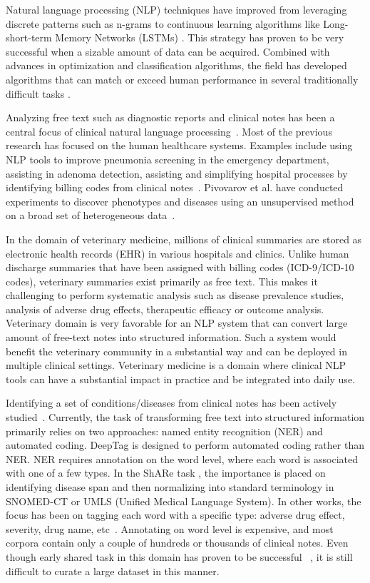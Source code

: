 \documentclass[fleqn,10pt]{wlscirep}
\begin{document}
Natural language processing (NLP)  techniques have improved from leveraging discrete patterns such as n-grams \cite{jurafsky2014speech} to continuous learning algorithms like Long-short-term Memory Networks (LSTMs) \cite{hochreiter1997long}. This strategy has proven to be very successful when a sizable amount of data can be acquired. Combined with advances in optimization and classification algorithms, the field has developed algorithms that can match or exceed human performance in several traditionally difficult tasks \cite{goldberg2017neural}.

Analyzing free text such as diagnostic reports and clinical notes has been a central focus of clinical natural language processing~\cite{velupillai2015recent}. Most of the previous research has focused on the human healthcare systems. Examples include using NLP tools to improve pneumonia screening in the emergency department, assisting in adenoma detection, assisting and simplifying hospital processes by identifying billing codes from clinical notes~\cite{demner2016aspiring}. Pivovarov et al. have conducted experiments to discover phenotypes and diseases using an unsupervised method on a broad set of heterogeneous data~\cite{pivovarov2015learning}.

In the domain of veterinary medicine, millions of clinical summaries are stored as electronic health records (EHR) in various hospitals and clinics. Unlike human discharge summaries that have been assigned with billing codes (ICD-9/ICD-10 codes), veterinary summaries exist primarily as free text. This makes it challenging to perform  systematic analysis  such as disease prevalence studies, analysis of adverse drug effects, therapeutic efficacy or outcome analysis. Veterinary domain is very favorable for an NLP system that can convert large amount of  free-text notes into structured information. Such a system would benefit the veterinary community in a substantial way and can be deployed in multiple clinical settings. Veterinary medicine is a domain where clinical NLP tools can have a substantial impact in practice and be integrated into daily use.

Identifying a set of conditions/diseases from clinical notes has been actively studied~\cite{demner2016aspiring,lipton2015learning}. Currently, the task of transforming free text into structured information primarily relies on two approaches: named entity recognition (NER) and automated coding. DeepTag is designed to perform automated coding rather than NER. NER requires annotation on the word level, where each word is associated with one of a few types. In the ShARe task \cite{pradhan2014evaluating}, the importance is placed on identifying disease span and then normalizing into standard terminology in SNOMED-CT or UMLS (Unified Medical Language System). In other works, the focus has been on tagging each word with a specific type: adverse drug effect, severity, drug name, etc~\cite{jagannatha2016bidirectional}. Annotating on word level is expensive, and most corpora contain only a couple of hundreds or thousands of clinical notes. Even though early shared task in this domain has proven to be successful  ~\cite{pradhan2014semeval,elhadad2015semeval}, it is still difficult to curate a large dataset in this manner.
\end{document}
